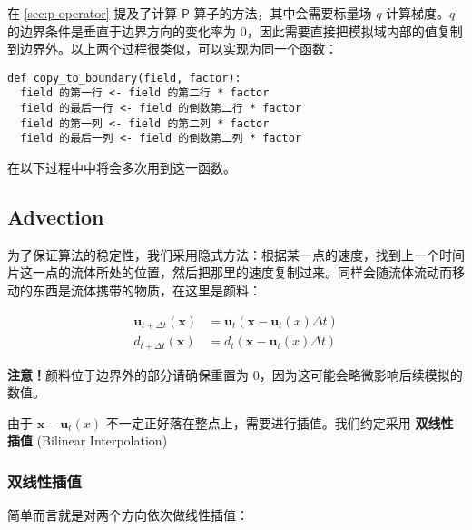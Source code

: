 \documentclass{ctexart}
\begin{document}
在 \ref{sec:p-operator} 提及了计算 $\mathsf{P}$ 算子的方法，其中会需要标量场 $q$ 计算梯度。$q$ 的边界条件是垂直于边界方向的变化率为 0，因此需要直接把模拟域内部的值复制到边界外。以上两个过程很类似，可以实现为同一个函数：

\begin{verbatim}
def copy_to_boundary(field, factor):
  field 的第一行 <- field 的第二行 * factor
  field 的最后一行 <- field 的倒数第二行 * factor
  field 的第一列 <- field 的第二列 * factor
  field 的最后一列 <- field 的倒数第二列 * factor
\end{verbatim}

在以下过程中中将会多次用到这一函数。

\subsection{Advection}

为了保证算法的稳定性，我们采用隐式方法：根据某一点的速度，找到上一个时间片这一点的流体所处的位置，然后把那里的速度复制过来。同样会随流体流动而移动的东西是流体携带的物质，在这里是颜料：

\begin{equation}
\begin{split}
  \mathbf{u}_{t + \Delta t}(\mathbf{x}) &= \mathbf{u}_t(\mathbf{x} - \mathbf{u}_t(x) \Delta t) \\
  d_{t + \Delta t}(\mathbf{x}) &= d_t(\mathbf{x} - \mathbf{u}_t(x) \Delta t)
\end{split}
\end{equation}

\textbf{注意！}颜料位于边界外的部分请确保重置为 0，因为这可能会略微影响后续模拟的数值。

由于 $\mathbf{x} - \mathbf{u}_t(x)$ 不一定正好落在整点上，需要进行插值。我们约定采用 \textbf{双线性插值} (Bilinear Interpolation)

\subsubsection{双线性插值}

简单而言就是对两个方向依次做线性插值：

\begin{figure}[!h]
  \centering

\end{figure}
\end{document}

